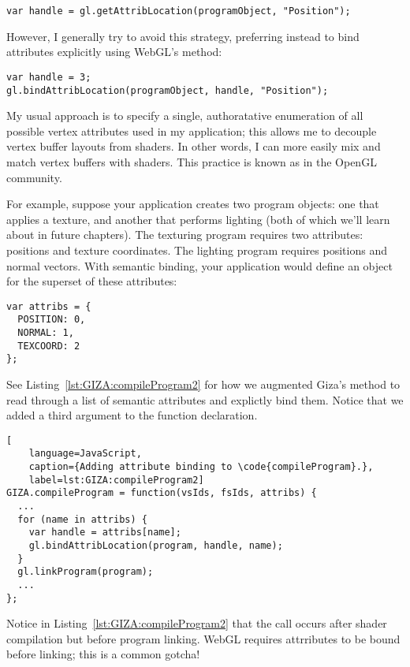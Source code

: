 \begin{lstlisting}
var handle = gl.getAttribLocation(programObject, "Position");
\end{lstlisting}

However, I generally try to avoid this strategy, preferring instead to bind attributes explicitly using WebGL's  method:

\begin{lstlisting}
var handle = 3;
gl.bindAttribLocation(programObject, handle, "Position");
\end{lstlisting}

My usual approach is to specify a single, authoratative enumeration of all possible vertex attributes used in my application; this allows me to decouple vertex buffer layouts from shaders.  In other words, I can more easily mix and match vertex buffers with shaders.  This practice is known as   in the OpenGL community.

For example, suppose your application creates two program objects: one that applies a texture, and another that performs lighting (both of which we'll learn about in future chapters).  The texturing program requires two attributes: positions and texture coordinates.  The lighting program requires positions and normal vectors.  With semantic binding, your application would define an object for the superset of these attributes:

\begin{lstlisting}
var attribs = {
  POSITION: 0,
  NORMAL: 1,
  TEXCOORD: 2
};
\end{lstlisting}

See Listing~\ref{lst:GIZA:compileProgram2} for how we augmented Giza's  method to read through a list of semantic attributes and explictly bind them.  Notice that we added a third argument to the function declaration.

\begin{lstlisting}[
    language=JavaScript,
    caption={Adding attribute binding to \code{compileProgram}.},
    label=lst:GIZA:compileProgram2]
GIZA.compileProgram = function(vsIds, fsIds, attribs) {
  ...
  for (name in attribs) {
    var handle = attribs[name];
    gl.bindAttribLocation(program, handle, name);
  }
  gl.linkProgram(program);
  ...
};
\end{lstlisting}

\begin{sidenote}%
Notice in Listing~\ref{lst:GIZA:compileProgram2} that the  call occurs after shader compilation but before program linking.  WebGL requires attrributes to be bound before linking; this is a common gotcha!
\end{sidenote}%

